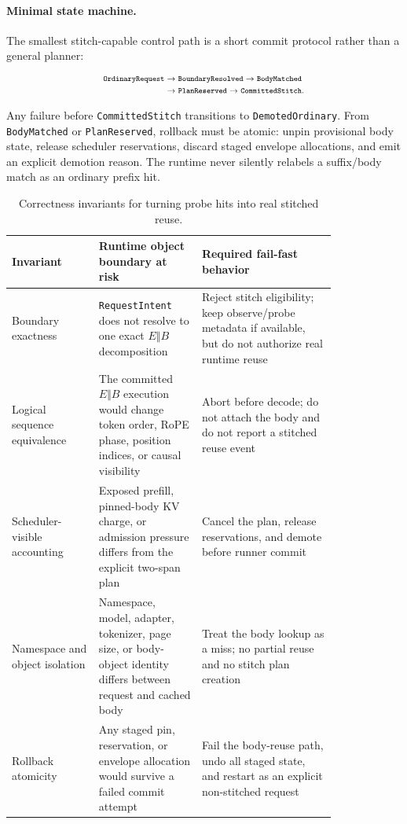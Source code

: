 \documentclass[conference]{IEEEtran}
\begin{document}
\paragraph{Minimal state machine.}
The smallest stitch-capable control path is a short commit protocol rather than a general planner:

\[
\scriptsize
\begin{aligned}
\texttt{OrdinaryRequest} &\rightarrow \texttt{BoundaryResolved} \rightarrow \texttt{BodyMatched} \\
&\rightarrow \texttt{PlanReserved} \rightarrow \texttt{CommittedStitch}.
\end{aligned}
\]

Any failure before \texttt{CommittedStitch} transitions to \texttt{DemotedOrdinary}. From \texttt{BodyMatched} or \texttt{PlanReserved}, rollback must be atomic: unpin provisional body state, release scheduler reservations, discard staged envelope allocations, and emit an explicit demotion reason. The runtime never silently relabels a suffix/body match as an ordinary prefix hit.

\begin{table}[t]
\caption{Correctness invariants for turning probe hits into real stitched reuse.}
\label{tab:stitch-invariants}
\centering
\footnotesize
\setlength{\tabcolsep}{3pt}
\begin{tabular}{@{}P{0.22\linewidth}P{0.26\linewidth}P{0.34\linewidth}@{}}
\toprule
Invariant & Runtime object boundary at risk & Required fail-fast behavior \\
\midrule
Boundary exactness & \texttt{RequestIntent} does not resolve to one exact $E \Vert B$ decomposition & Reject stitch eligibility; keep observe/probe metadata if available, but do not authorize real runtime reuse \\
Logical sequence equivalence & The committed $E \Vert B$ execution would change token order, RoPE phase, position indices, or causal visibility & Abort before decode; do not attach the body and do not report a stitched reuse event \\
Scheduler-visible accounting & Exposed prefill, pinned-body KV charge, or admission pressure differs from the explicit two-span plan & Cancel the plan, release reservations, and demote before runner commit \\
Namespace and object isolation & Namespace, model, adapter, tokenizer, page size, or body-object identity differs between request and cached body & Treat the body lookup as a miss; no partial reuse and no stitch plan creation \\
Rollback atomicity & Any staged pin, reservation, or envelope allocation would survive a failed commit attempt & Fail the body-reuse path, undo all staged state, and restart as an explicit non-stitched request \\
\bottomrule
\end{tabular}
\end{table}
\end{document}
